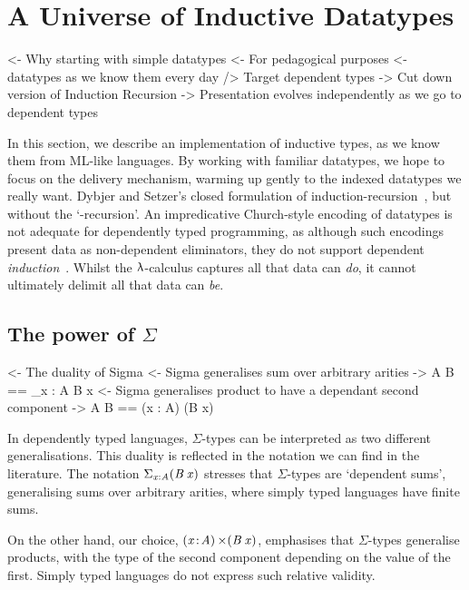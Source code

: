 \section{A Universe of Inductive Datatypes}
\label{sec:universe-desc}

\begin{wstructure}
<- Why starting with simple datatypes
    <- For pedagogical purposes
        <- datatypes as we know them every day
        /> Target dependent types
    -> Cut down version of Induction Recursion
        -> Presentation evolves independently as we go to dependent types
\end{wstructure}

In this section, we describe an implementation of inductive types, as
we know them from ML-like languages. By working with familiar datatypes,
we hope to focus on the delivery mechanism, warming up gently to the
indexed datatypes we really want.  %
Dybjer and Setzer's closed formulation of
induction-recursion~\cite{dybjer:axiom-ir}, but without the
`-recursion'.  An impredicative Church-style encoding of datatypes is
not adequate for dependently typed programming, as although such
encodings present data as non-dependent eliminators, they do not
support dependent \emph{induction}~\cite{geuvers:induction-not-derivable}.
Whilst the \(\LAMBINDER\)-calculus captures all that data can \emph{do},
it cannot ultimately delimit all that data can \emph{be}.

\subsection{The power of $\Sigma$}

\begin{wstructure}
<- The duality of Sigma
    <- Sigma generalises sum over arbitrary arities
        -> \Sigma A B == \Sigma_{x : A} B x
    <- Sigma generalises product to have a dependant second component
        -> \Sigma A B == (x : A) \times (B x)
\end{wstructure}

In dependently typed languages, $\Sigma$-types can be interpreted as
two different generalisations. This duality is reflected in the
notation we can find in the literature. The notation
$\blue{\Sigma}_{\x : \M{A}} (\M{B}\: \x)$ stresses that
$\Sigma$-types are `dependent sums', generalising sums over
arbitrary arities, where simply typed languages have finite sums.

On the other hand, our choice, $\SIGMA{\x}{\M{A}}
(\M{B}\:\x)$, emphasises that $\Sigma$-types generalise products,
with the type of the second component depending on the value of the
first. Simply typed languages do not express such relative validity.

